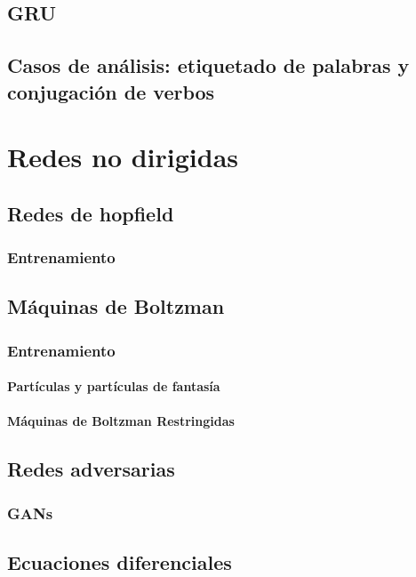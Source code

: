 \documentclass[12pt,openany]{book}
\begin{document}
\chapter{GRU}
\chapter{Casos de análisis: etiquetado de palabras y conjugación de verbos}

\part{Redes no dirigidas}
\chapter{Redes de hopfield}
\section{Entrenamiento}

\chapter{Máquinas de Boltzman}
\section{Entrenamiento}
\subsection{Partículas y partículas de fantasía}
\subsection{Máquinas de Boltzman Restringidas}

\chapter{Redes adversarias}
\section{GANs}

\appendix 
\chapter{Ecuaciones diferenciales}

\backmatter

\printbibliography[heading=bibintoc]
\end{document}
